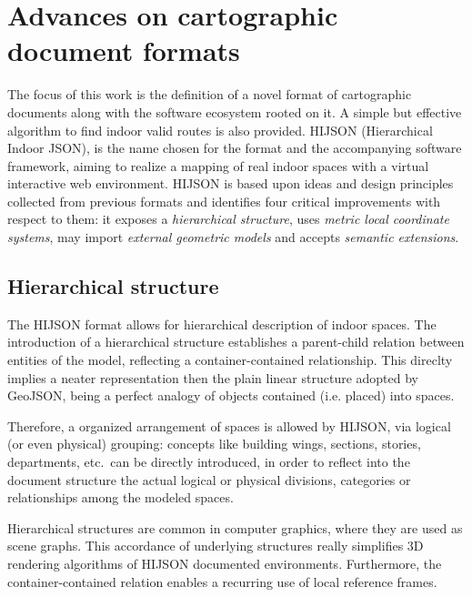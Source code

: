 
\section{Advances on cartographic\\ document formats}\label{advances-on-cartographic-document-format}
\label{advances}

The focus of this work is the definition of a novel format of cartographic
documents along with the software ecosystem rooted on it. A simple but
effective algorithm to find indoor valid routes is also provided.  {HIJSON}
({H}ierarchical {I}ndoor {JSON}),  is the name chosen
for the format and the accompanying software framework, aiming to realize a
mapping of real indoor spaces with a virtual interactive web environment.
HIJSON is based upon ideas and design principles collected from previous
formats and identifies four critical improvements with respect to them: it
exposes a \emph{hierarchical structure}, uses \emph{metric local coordinate
systems}, may import \emph{external geometric models} and accepts \emph{semantic
extensions}. 

\subsection{Hierarchical structure}\label{hierarchical-structure}

The HIJSON format allows for hierarchical description of indoor spaces. The
introduction of a hierarchical structure establishes a parent-child relation
between entities of the model, reflecting a container-contained relationship.
This direclty implies a neater representation then the plain linear structure
adopted by GeoJSON, being a perfect analogy of objects contained (i.e.
placed) into spaces.

Therefore, a  organized arrangement of spaces is allowed by HIJSON, via
logical (or even physical) grouping: concepts like building wings, sections,
stories, departments, etc.~can be directly introduced, in order to reflect
into the document structure the actual logical or physical divisions,
categories or relationships among the modeled spaces.

Hierarchical structures are common in computer graphics, where they are used
as scene graphs. This accordance of underlying structures really simplifies 3D
rendering algorithms of HIJSON documented environments. Furthermore, the
container-contained relation enables a recurring use of local reference
frames.

